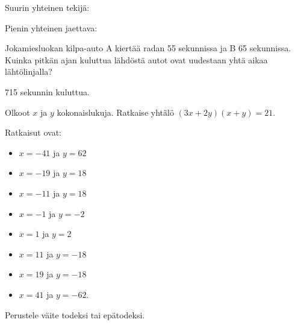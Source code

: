 \begin{tehtavasivu}
\begin{tehtava}
    \begin{vastaus}
        Suurin yhteinen tekijä:
        \begin{alakohdatrivi}
        \end{alakohdatrivi}
        Pienin yhteinen jaettava:
        \begin{alakohdatrivi}
        \end{alakohdatrivi}
    \end{vastaus}
    
\end{tehtava}

\begin{tehtava}
    Jokamiesluokan kilpa-auto A kiertää radan 55 sekunnissa ja B 65 sekunnissa. Kuinka pitkän ajan kuluttua lähdöstä autot ovat uudestaan yhtä aikaa lähtölinjalla?
    
    \begin{vastaus}
        715 sekunnin kuluttua.
    \end{vastaus}
\end{tehtava}

\begin{tehtava}
    Olkoot $x$ ja $y$ kokonaislukuja. Ratkaise yhtälö $(3x+2y)(x+y)=21$.
    
    \begin{vastaus}
        Ratkaisut ovat:
        \begin{itemize}
            \item $x = -41$ ja $y = 62$
            \item $x = -19$ ja $y = 18$
            \item $x = -11$ ja $y = 18$
            \item $x = -1$ ja $y = -2$
            \item $x = 1$ ja $y = 2$
            \item $x = 11$ ja $y = -18$
            \item $x = 19$ ja $y = -18$
            \item $x = 41$ ja $y = -62$.
        \end{itemize}
    \end{vastaus}
    
\end{tehtava}

\begin{tehtava}
    Perustele väite todeksi tai epätodeksi.
    

\end{tehtava}
\end{tehtavasivu}

